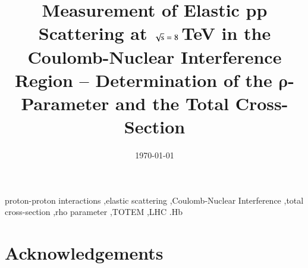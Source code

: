 \documentclass[3p,onecolumn,12pt,times,longtitle]{elsarticle}
\begin{document}
\begin{frontmatter}

\title{Measurement of Elastic pp Scattering at $\sqrt{\hbox{s}} = \hbox{8}$\,TeV in the Coulomb-Nuclear Interference Region -- Determination of the $\mathbf{\rho}$-Parameter and the Total Cross-Section}



\date{\today}

\begin{abstract}

\end{abstract}

\begin{keyword}
proton-proton interactions \sep elastic scattering \sep Coulomb-Nuclear Interference \sep total cross-section \sep rho parameter \sep TOTEM \sep LHC
.Hb %
\end{keyword}
\end{frontmatter}



\linenumbers















\section*{Acknowledgements}


\begin{thebibliography}{99}

\end{thebibliography}
\end{document}
